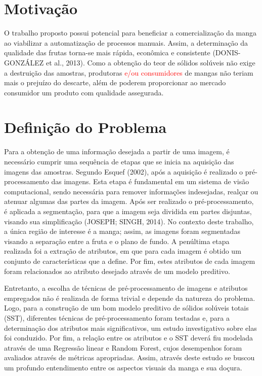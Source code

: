 \section{Motivação}

O trabalho proposto possui potencial para beneficiar a comercialização da manga ao viabilizar a automatização de processos manuais. Assim, a determinação da qualidade das frutas torna-se mais rápida, econômica e consistente (DONIS-GONZÁLEZ et al., 2013). Como a obtenção do teor de sólidos solúveis não exige a destruição das amostras, produtoras \textcolor{red}{e/ou consumidores} de mangas não teriam mais o prejuízo do descarte, além de poderem proporcionar ao mercado consumidor um produto com qualidade assegurada. 

\section{Definição do Problema}

Para a obtenção de uma informação desejada a partir de uma imagem, é necessário cumprir uma sequência de etapas que se inicia na aquisição das imagens das amostras. Segundo Esquef (2002), após a aquisição é realizado o pré-processamento das imagens. Esta etapa é fundamental em um sistema de visão computacional, sendo necessária para remover informações indesejadas, realçar ou atenuar algumas das partes da imagem. Após ser realizado o pré-processamento, é aplicada a segmentação, para que a imagem seja dividida em partes disjuntas, visando sua simplificação (JOSEPH; SINGH, 2014). No contexto deste trabalho, a única região de interesse é a manga; assim, as imagens foram segmentadas visando a separação entre a fruta e o plano de fundo. A penúltima etapa realizada foi a extração de atributos, em que para cada imagem é obtido um conjunto de características que a define. Por fim, estes atributos de cada imagem foram relacionados ao atributo desejado através de um modelo preditivo.

Entretanto, a escolha de técnicas de pré-processamento de imagens e atributos empregados não é realizada de forma trivial e depende da natureza do problema. Logo, para a construção de um bom modelo preditivo de sólidos solúveis totais (SST), diferentes técnicas de pré-processamento foram testadas e, para a determinação dos atributos mais significativos, um estudo investigativo sobre elas foi conduzido. Por fim, a relação entre os atributos e o SST deverá fiu modelada através de uma Regressão linear e Random Forest, cujos desempenhos foram avaliados através de métricas apropriadas. Assim, através deste estudo se buscou um profundo entendimento entre os aspectos visuais da manga e sua doçura. 

